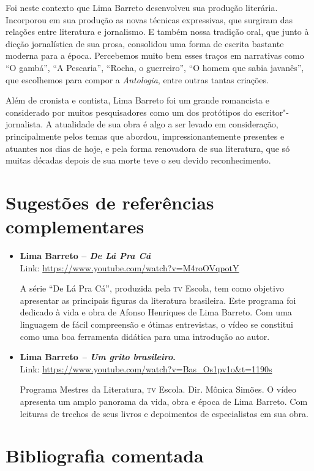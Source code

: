 \documentclass[11pt]{extarticle}
\begin{document}
Foi neste contexto que Lima Barreto desenvolveu sua produção literária.
Incorporou em sua produção as novas técnicas expressivas, que surgiram
das relações entre literatura e jornalismo. E também nossa tradição
oral, que junto à dicção jornalística de sua prosa, consolidou uma forma
de escrita bastante moderna para a época. Percebemos muito bem esses
traços em narrativas como ``O gambá'', ``A
Pescaria'', ``Rocha, o guerreiro'', ``O homem
que sabia javanês'', que escolhemos para compor a \emph{Antologia},
entre outras tantas criações.

Além de cronista e contista, Lima Barreto foi um grande romancista e
considerado por muitos pesquisadores como um dos protótipos do
escritor"-jornalista. A atualidade de sua obra é algo a ser levado em
consideração, principalmente pelos temas que abordou,
impressionantemente presentes e atuantes nos dias de hoje, e pela forma
renovadora de sua literatura, que só muitas décadas depois de sua morte
teve o seu devido reconhecimento.

\section{Sugestões de referências complementares}\label{sugestoes}

\begin{itemize}
\item \textbf{Lima Barreto -- \emph{De Lá Pra Cá} }\\
Link: \url{https://www.youtube.com/watch?v=M4roOVqpotY}

A série ``De Lá Pra Cá'', produzida pela \textsc{tv} Escola, tem como objetivo
apresentar as principais figuras da literatura brasileira. Este programa
foi dedicado à vida e obra de Afonso Henriques de Lima Barreto. Com uma
linguagem de fácil compreensão e ótimas entrevistas, o vídeo se
constitui como uma boa ferramenta didática para uma introdução ao autor.

\item \textbf{Lima Barreto \emph{-- Um grito brasileiro}. }\\
Link: \url{https://www.youtube.com/watch?v=Bas_Os1pv1o\&t=1190s}

Programa Mestres da Literatura, \textsc{tv} Escola. Dir. Mônica Simões. O vídeo
apresenta um amplo panorama da vida, obra e época de Lima Barreto. Com
leituras de trechos de seus livros e depoimentos de especialistas em sua
obra.
\end{itemize}


\section{Bibliografia comentada}
\end{document}
